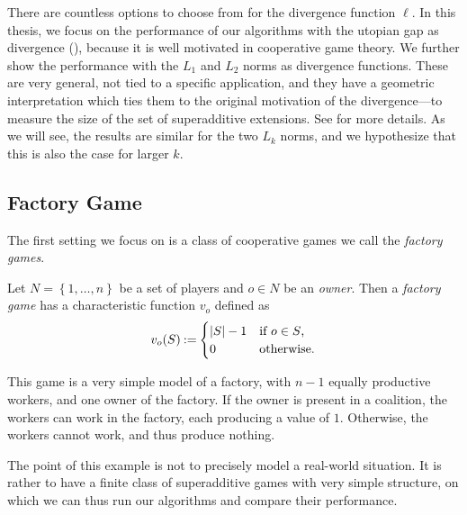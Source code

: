 There are countless options to choose from for the divergence function $ \ell $.
In this thesis, we focus on the performance of our algorithms with the utopian gap as divergence (), because it is well motivated in cooperative game theory.
We further show the performance with the $ L_1 $ and $ L_2 $ norms as divergence functions.
These are very general, not tied to a specific application, and they have a geometric interpretation which ties them to the original motivation of the divergence---to measure the size of the set of superadditive extensions.
See  for more details.
As we will see, the results are similar for the two $ L_k $ norms, and we hypothesize that this is also the case for larger $k$.

\subsection{Factory Game}

The first setting  we focus on is a class of cooperative games we call the \emph{factory games}.

\begin{defi}
  Let $ N = \left\{ 1, \ldots, n \right\} $ be a set of players and $ o \in N $ be an \emph{owner}.
  Then a \emph{factory game} has a characteristic function $ v_o $ defined as \[
    v_o\!\left(S\right) \mathbin{:=} \begin{cases}
      \left\lvert S \right\rvert - 1 & \text{if $ o \in S $,} \\
      0                & \text{otherwise.}
    \end{cases}
  \]
\end{defi}

This game is a very simple model of a factory, with $ n-1 $ equally productive workers, and one owner of the factory.
If the owner is present in a coalition, the workers can work in the factory, each producing a value of $ 1 $.
Otherwise, the workers cannot work, and thus produce nothing.

The point of this example is not to precisely model a real-world situation.
It is rather to have a finite class of superadditive games with very simple structure, on which we can thus run our algorithms and compare their performance.

